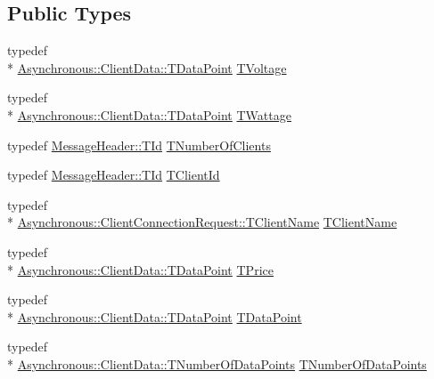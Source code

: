 \subsection*{Public Types}
\begin{DoxyCompactItemize}
\item 
typedef \\*
\hyperlink{class_terra_swarm_1_1_asynchronous_1_1_client_data_ac733720fed15e940f991de44f1bb514e}{Asynchronous\-::\-Client\-Data\-::\-T\-Data\-Point} \hyperlink{class_control_manager_a336440023399b9165c117020f6b14ec3}{T\-Voltage}
\item 
typedef \\*
\hyperlink{class_terra_swarm_1_1_asynchronous_1_1_client_data_ac733720fed15e940f991de44f1bb514e}{Asynchronous\-::\-Client\-Data\-::\-T\-Data\-Point} \hyperlink{class_control_manager_a24609feed8b0443df450b070194df20a}{T\-Wattage}
\item 
typedef \hyperlink{class_terra_swarm_1_1_message_header_ab55de822fadad758edcd8f36bd07676e}{Message\-Header\-::\-T\-Id} \hyperlink{class_control_manager_a7eefb0a4e9d10e65771939912d650bcc}{T\-Number\-Of\-Clients}
\item 
typedef \hyperlink{class_terra_swarm_1_1_message_header_ab55de822fadad758edcd8f36bd07676e}{Message\-Header\-::\-T\-Id} \hyperlink{class_control_manager_a1bff13cab35db39c43f81f49b56e4849}{T\-Client\-Id}
\item 
typedef \\*
\hyperlink{class_terra_swarm_1_1_asynchronous_1_1_client_connection_request_a50a16fcfef8eb10d5191b6eaf0723a92}{Asynchronous\-::\-Client\-Connection\-Request\-::\-T\-Client\-Name} \hyperlink{class_control_manager_ae9c86c5286c9ebf222ea44b60c463872}{T\-Client\-Name}
\item 
typedef \\*
\hyperlink{class_terra_swarm_1_1_asynchronous_1_1_client_data_ac733720fed15e940f991de44f1bb514e}{Asynchronous\-::\-Client\-Data\-::\-T\-Data\-Point} \hyperlink{class_control_manager_acad2d80fd0659e3d979389de905e7b5b}{T\-Price}
\item 
typedef \\*
\hyperlink{class_terra_swarm_1_1_asynchronous_1_1_client_data_ac733720fed15e940f991de44f1bb514e}{Asynchronous\-::\-Client\-Data\-::\-T\-Data\-Point} \hyperlink{class_control_manager_a236ef5279ad4f3082443e4c6d300a7d2}{T\-Data\-Point}
\item 
typedef \\*
\hyperlink{class_terra_swarm_1_1_asynchronous_1_1_client_data_a690994afd0ba9b8eeb56ae679a5c64e8}{Asynchronous\-::\-Client\-Data\-::\-T\-Number\-Of\-Data\-Points} \hyperlink{class_control_manager_a90ca5d46699df9c6e67c96e36727eff1}{T\-Number\-Of\-Data\-Points}
\end{DoxyCompactItemize}
